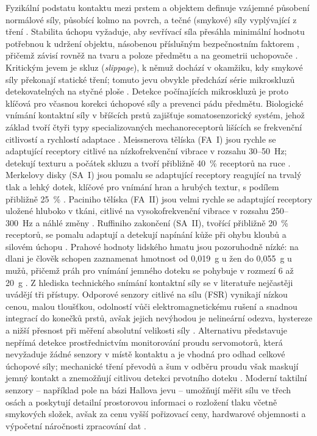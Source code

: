 Fyzikální podstatu kontaktu mezi prstem a objektem definuje vzájemné působení normálové síly, působící kolmo na povrch, a tečné (smykové) síly vyplývající z tření \cite{Dutta2002, GIUDICI2025}. Stabilita úchopu vyžaduje, aby sevřívací síla přesáhla minimální hodnotu potřebnou k udržení objektu, násobenou příslušným bezpečnostním faktorem \cite{Mayer2020427}, přičemž závisí rovněž na tvaru a poloze předmětu a na geometrii uchopovače \cite{Devaraja20201222}. Kritickým jevem je skluz (\textit{slippage}), k němuž dochází v okamžiku, kdy smykové síly překonají statické tření; tomuto jevu obvykle předchází série mikroskluzů detekovatelných na styčné ploše \cite{Begalinova2020, Xu2025}. Detekce počínajících mikroskluzů je proto klíčová pro včasnou korekci úchopové síly a prevenci pádu předmětu.
Biologické vnímání kontaktní síly v bříšcích prstů zajišťuje somatosenzorický systém, jehož základ tvoří čtyři typy specializovaných mechanoreceptorů lišících se frekvenční citlivostí a rychlostí adaptace \cite{Stuchla2024, Cihak2016}. Meissnerova tělíska (FA~I) jsou rychle se adaptující receptory citlivé na nízkofrekvenční vibrace v rozsahu 30–50~Hz; detekují texturu a počátek skluzu a tvoří přibližně 40~\% receptorů na ruce \cite{Stuchla2024, Cihak2016}. Merkelovy disky (SA~I) jsou pomalu se adaptující receptory reagující na trvalý tlak a lehký dotek, klíčové pro vnímání hran a hrubých textur, s podílem přibližně 25~\% \cite{Stuchla2024, Cihak2016}. Paciniho tělíska (FA~II) jsou velmi rychle se adaptující receptory uložené hluboko v tkáni, citlivé na vysokofrekvenční vibrace v rozsahu 250–300~Hz a náhlé změny \cite{Stuchla2024, Cihak2016}. Ruffiniho zakončení (SA~II), tvořící přibližně 20~\% receptorů, se pomalu adaptují a detekují napínání kůže při ohybu kloubů a silovém úchopu \cite{Stuchla2024, Cihak2016}. Prahové hodnoty lidského hmatu jsou pozoruhodně nízké: na dlani je člověk schopen zaznamenat hmotnost od 0,019~g u žen do 0,055~g u mužů, přičemž práh pro vnímání jemného doteku se pohybuje v rozmezí 6 až 20~g \cite{Stuchla2024}.
Z hlediska technického snímání kontaktní síly se v literatuře nejčastěji uvádějí tři přístupy. Odporové senzory citlivé na sílu (FSR) vynikají nízkou cenou, malou tloušťkou, odolností vůči elektromagnetickému rušení a snadnou integrací do konečků prstů, avšak jejich nevýhodou je nelineární odezva, hystereze a nižší přesnost při měření absolutní velikosti síly \cite{Sadun2016711, Lebosse2011}. Alternativu představuje nepřímá detekce prostřednictvím monitorování proudu servomotorů, která nevyžaduje žádné senzory v místě kontaktu a je vhodná pro odhad celkové úchopové síly; mechanické tření převodů a šum v odběru proudu však maskují jemný kontakt a znemožňují citlivou detekci prvotního doteku \cite{Mohammadi2024418, Ninu2014}. Moderní taktilní senzory -- například pole na bázi Hallova jevu -- umožňují měřit sílu ve třech osách a poskytují detailní prostorovou informaci o rozložení tlaku včetně smykových složek, avšak za cenu vyšší pořizovací ceny, hardwarové objemnosti a výpočetní náročnosti zpracování dat \cite{GIUDICI2025, Begalinova2020, Xu2025}.
